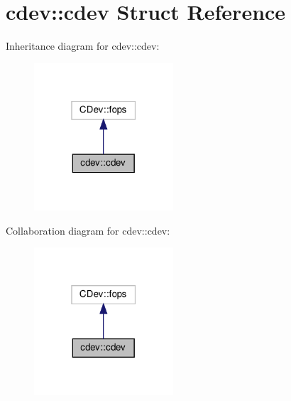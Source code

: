 \hypertarget{structcdev_1_1cdev}{}\section{cdev\+:\+:cdev Struct Reference}
\label{structcdev_1_1cdev}


Inheritance diagram for cdev\+:\+:cdev\+:\nopagebreak
\begin{figure}[H]
\begin{center}
\leavevmode
\includegraphics[width=147pt]{d6/d11/structcdev_1_1cdev__inherit__graph}
\end{center}
\end{figure}


Collaboration diagram for cdev\+:\+:cdev\+:\nopagebreak
\begin{figure}[H]
\begin{center}
\leavevmode
\includegraphics[width=147pt]{d9/d7b/structcdev_1_1cdev__coll__graph}
\end{center}
\end{figure}
